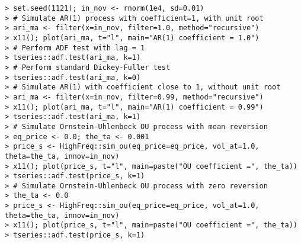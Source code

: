 \documentclass[10pt]{beamer}\usepackage[]{graphicx}\usepackage[]{color}
\makeatletter
\newenvironment{kframe}{%
 \def\at@end@of@kframe{}%
 \ifinner\ifhmode%
  \def\at@end@of@kframe{\end{minipage}}%
  \begin{minipage}{\columnwidth}%
 \fi\fi%
 \def\FrameCommand##1{\hskip\@totalleftmargin \hskip-\fboxsep
 \colorbox{shadecolor}{##1}\hskip-\fboxsep
     \hskip-\linewidth \hskip-\@totalleftmargin \hskip\columnwidth}%
 \MakeFramed {\advance\hsize-\width
   \@totalleftmargin\z@ \linewidth\hsize
   \@setminipage}}%
 {\par\unskip\endMakeFramed%
 \at@end@of@kframe}
\newenvironment{knitrout}{}{} %
\makeatother
\begin{document}
\begin{frame}[fragile,t]{\subsecname}
\begin{block}{}
\begin{columns}[T]
\begin{knitrout}
\begin{kframe}
\begin{verbatim}
> set.seed(1121); in_nov <- rnorm(1e4, sd=0.01)
> # Simulate AR(1) process with coefficient=1, with unit root
> ari_ma <- filter(x=in_nov, filter=1.0, method="recursive")
> x11(); plot(ari_ma, t="l", main="AR(1) coefficient = 1.0")
> # Perform ADF test with lag = 1
> tseries::adf.test(ari_ma, k=1)
> # Perform standard Dickey-Fuller test
> tseries::adf.test(ari_ma, k=0)
> # Simulate AR(1) with coefficient close to 1, without unit root
> ari_ma <- filter(x=in_nov, filter=0.99, method="recursive")
> x11(); plot(ari_ma, t="l", main="AR(1) coefficient = 0.99")
> tseries::adf.test(ari_ma, k=1)
> # Simulate Ornstein-Uhlenbeck OU process with mean reversion
> eq_price <- 0.0; the_ta <- 0.001
> price_s <- HighFreq::sim_ou(eq_price=eq_price, vol_at=1.0, theta=the_ta, innov=in_nov)
> x11(); plot(price_s, t="l", main=paste("OU coefficient =", the_ta))
> tseries::adf.test(price_s, k=1)
> # Simulate Ornstein-Uhlenbeck OU process with zero reversion
> the_ta <- 0.0
> price_s <- HighFreq::sim_ou(eq_price=eq_price, vol_at=1.0, theta=the_ta, innov=in_nov)
> x11(); plot(price_s, t="l", main=paste("OU coefficient =", the_ta))
> tseries::adf.test(price_s, k=1)
\end{verbatim}
\end{kframe}
\end{knitrout}
  \end{columns}
\end{block}

\end{frame}


\end{document}
